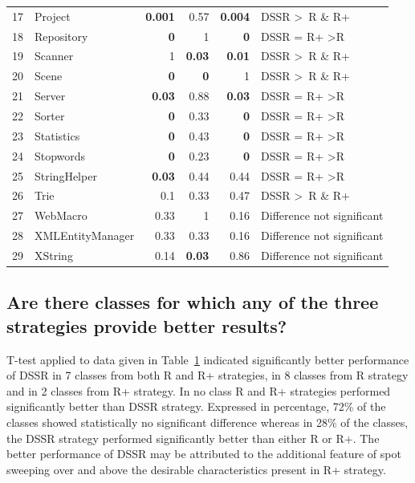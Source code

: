 \begin{table}[htp]
{\begin{tabular}{rlrrrl}
17		&	Project			&	\textbf{0.001}	&0.57			&\textbf{0.004}	& DSSR \textgreater~R \& R+ 				\\		
18		&	Repository		&	\textbf{0}		&1				&\textbf{0}		& DSSR = R+ \textgreater R 		\\
19		&	Scanner			&	1				&\textbf{0.03}	&\textbf{0.01}	& DSSR \textgreater~R \& R+  				\\
20		&	Scene			&	\textbf{0}		&\textbf{0}		& 1				& DSSR \textgreater~R \& R+  				\\
21		&	Server			&	\textbf{0.03}		& 0.88			&\textbf{0.03} 	& DSSR = R+ \textgreater R 		\\
22		&	Sorter			& 	\textbf{0}		& 0.33			&\textbf{0}		& DSSR = R+ \textgreater R 		\\
23		&	Statistics		&	\textbf{0}		& 0.43			&\textbf{0}		& DSSR = R+ \textgreater R 		\\
24		&	Stopwords		&	\textbf{0}		& 0.23			&\textbf{0}		& DSSR = R+ \textgreater R 		\\
25		&	StringHelper		&	\textbf{0.03}		& 0.44			&0.44			& DSSR = R+ \textgreater R 		\\
26		& 	Trie				&	0.1				& 0.33			&0.47			& DSSR \textgreater~R \& R+  				\\
27		&	WebMacro		&	0.33			& 1				&0.16			& Difference not significant		\\
28		&	XMLEntityManager&	0.33			& 0.33			&0.16			& Difference not significant		\\
29 		&	XString			&	0.14			&\textbf{0.03}	&0.86			& Difference not significant		\\


\end{tabular}
}
\bigskip
\label{table:ttest}
\end{table}

\subsection{Are there classes for which any of the three strategies provide better results?}

T-test applied to data given in Table~\ref{table:ttest} indicated significantly better performance of DSSR in 7 classes from both R and R+ strategies, in 8 classes from R strategy and in 2 classes from R+ strategy. In no class R and R+ strategies performed significantly better than DSSR strategy. Expressed in percentage, 72\%  of the classes showed statistically no significant difference whereas in 28\% of the classes, the DSSR strategy performed significantly better than either R or R+. The better performance of DSSR may be attributed to the additional feature of spot sweeping over and above the desirable characteristics present in R+ strategy. 


